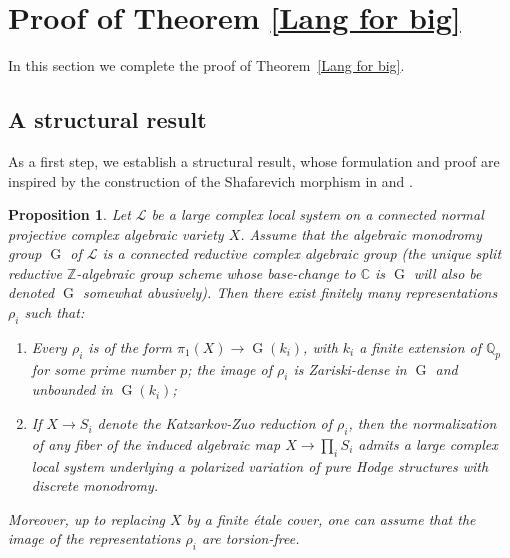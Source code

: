 \documentclass[11pt,letterpaper]{amsart}
\def\bZ{\mathbb{Z}}
\def\bQ{\mathbb{Q}}
\def\bC{\mathbb{C}}
\def\bZ{\mathbb{Z}}
\def\cL{\mathcal{L}}
\theoremstyle{plain}
\newtheorem{prop}[thm]{Proposition}
\DeclareMathOperator{\rG}{G}
\begin{document}
 
\section{Proof of Theorem \ref{Lang for big}}
In this section we complete the proof of Theorem~\ref{Lang for big}.

\subsection{A structural result}
 As a first step, we establish a structural result, whose formulation and proof are inspired by the construction of the Shafarevich morphism in \cite{Eyssidieux-reductive} and \cite{Brunebarbe-Shafarevich}.
\begin{prop}\label{Structure result}
Let $\cL$ be a large complex local system on a connected normal projective complex algebraic variety $X$. Assume that the algebraic monodromy group $\rG$ of $\cL$ is a connected reductive complex algebraic group (the unique split reductive $\bZ$-algebraic group scheme whose base-change to $\bC$ is $\rG$ will also be denoted $\rG$ somewhat abusively). Then there exist finitely many representations $\rho_i$ such that:
\begin{enumerate}
\item Every $\rho_i$ is of the form $\pi_1(X) \rightarrow \rG(k_i)$, with $k_i$ a finite extension of $\bQ_p$ for some prime number $p$; the image of $\rho_i$ is Zariski-dense in $\rG$ and unbounded in $\rG(k_i)$;
\item If $X \to S_i$ denote the Katzarkov-Zuo reduction of $\rho_i$, then the normalization of any fiber  of the induced algebraic map $X \to \prod_i S_i$ admits a large complex local system underlying a polarized variation of pure Hodge structures with discrete monodromy.
\end{enumerate} 
Moreover, up to replacing $X$ by a finite étale cover, one can assume that the image of the representations $\rho_i$ are torsion-free.    
\end{prop}
\end{document}
